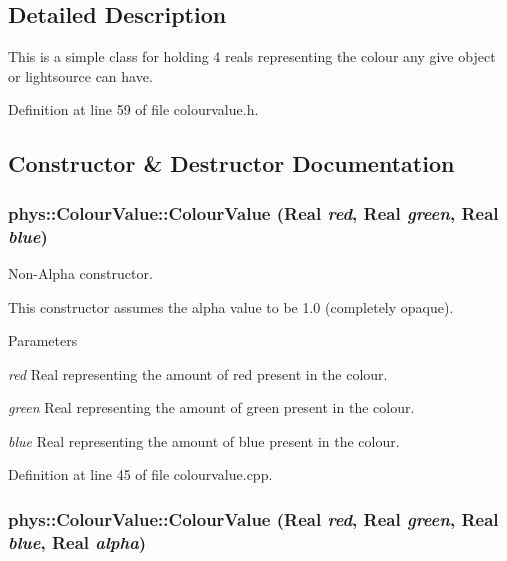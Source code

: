 \subsection{Detailed Description}
This is a simple class for holding 4 reals representing the colour any give object or lightsource can have. 

Definition at line 59 of file colourvalue.h.



\subsection{Constructor \& Destructor Documentation}
\hypertarget{classphys_1_1ColourValue_ac63b5fbf1b35b1855330ed5737fc16e0}{
\subsubsection[{ColourValue}]{\setlength{\rightskip}{0pt plus 5cm}phys::ColourValue::ColourValue ({\bf Real} {\em red}, \/  {\bf Real} {\em green}, \/  {\bf Real} {\em blue})}}
\label{d3/db0/classphys_1_1ColourValue_ac63b5fbf1b35b1855330ed5737fc16e0}


Non-\/Alpha constructor. 

This constructor assumes the alpha value to be 1.0 (completely opaque). 
\begin{DoxyParams}{Parameters}
\item[{\em red}]Real representing the amount of red present in the colour. \item[{\em green}]Real representing the amount of green present in the colour. \item[{\em blue}]Real representing the amount of blue present in the colour. \end{DoxyParams}


Definition at line 45 of file colourvalue.cpp.

\hypertarget{classphys_1_1ColourValue_a28ee2493cd6a7bb8bc4104d223e3e709}{
\subsubsection[{ColourValue}]{\setlength{\rightskip}{0pt plus 5cm}phys::ColourValue::ColourValue ({\bf Real} {\em red}, \/  {\bf Real} {\em green}, \/  {\bf Real} {\em blue}, \/  {\bf Real} {\em alpha})}}
\label{d3/db0/classphys_1_1ColourValue_a28ee2493cd6a7bb8bc4104d223e3e709}


